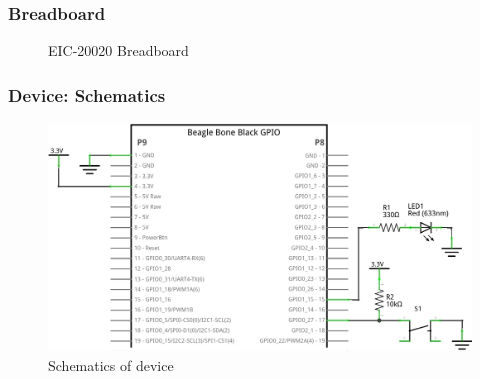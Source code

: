 \documentclass[aspectratio=169,usenames,dvipsnames]{beamer}
\begin{document}
\begin{frame}
  \frametitle{Breadboard}
    \begin{figure}
      \centering
      \begin{overlayarea}{\textwidth}{0.8\textheight}
        \caption{EIC-20020 Breadboard}
      \end{overlayarea}
  \end{figure}
\end{frame}

\begin{frame}
  \frametitle{Device: Schematics}
    \begin{figure}
      \centering
      \includegraphics[scale=1]{images/lab1_schem.png}
      \caption{Schematics of device}
  \end{figure}
  \vspace*{-5mm}
\end{frame}
\end{document}
